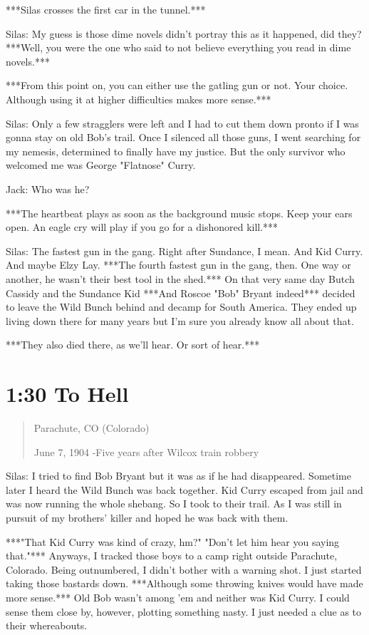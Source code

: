 \documentclass{article}
\begin{document}
***Silas crosses the first car in the tunnel.***

Silas: My guess is those dime novels didn't portray this as it happened, did they? ***Well, you were the one who said to not believe everything you read in dime novels.***

***From this point on, you can either use the gatling gun or not. Your choice. Although using it at higher difficulties makes more sense.***

Silas: Only a few stragglers were left and I had to cut them down pronto if I was gonna stay on old Bob's trail. Once I silenced all those guns, I went searching for my nemesis, determined to finally have my justice. But the only survivor who welcomed me was George "Flatnose" Curry.

Jack: Who was he?

***The heartbeat plays as soon as the background music stops. Keep your ears open. An eagle cry will play if you go for a dishonored kill.***

Silas: The fastest gun in the gang. Right after Sundance, I mean. And Kid Curry. And maybe Elzy Lay. ***The fourth fastest gun in the gang, then. One way or another, he wasn't their best tool in the shed.*** On that very same day Butch Cassidy and the Sundance Kid ***And Roscoe "Bob" Bryant indeed*** decided to leave the Wild Bunch behind and decamp for South America. They ended up living down there for many years but I'm sure you already know all about that.

***They also died there, as we'll hear. Or sort of hear.***

\section*{1:30 To Hell}

\begin{quote}
    Parachute, CO (Colorado)

    June 7, 1904 -Five years after Wilcox train robbery
\end{quote}

Silas: I tried to find Bob Bryant but it was as if he had disappeared. Sometime later I heard the Wild Bunch was back together. Kid Curry escaped from jail and was now running the whole shebang. So I took to their trail. As I was still in pursuit of my brothers' killer and hoped he was back with them.

***"That Kid Curry was kind of crazy, hm?" "Don't let him hear you saying that."*** Anyways, I tracked those boys to a camp right outside Parachute, Colorado. Being outnumbered, I didn't bother with a warning shot. I just started taking those bastards down. ***Although some throwing knives would have made more sense.*** Old Bob wasn't among 'em and neither was Kid Curry. I could sense them close by, however, plotting something nasty. I just needed a clue as to their whereabouts.
\end{document}
